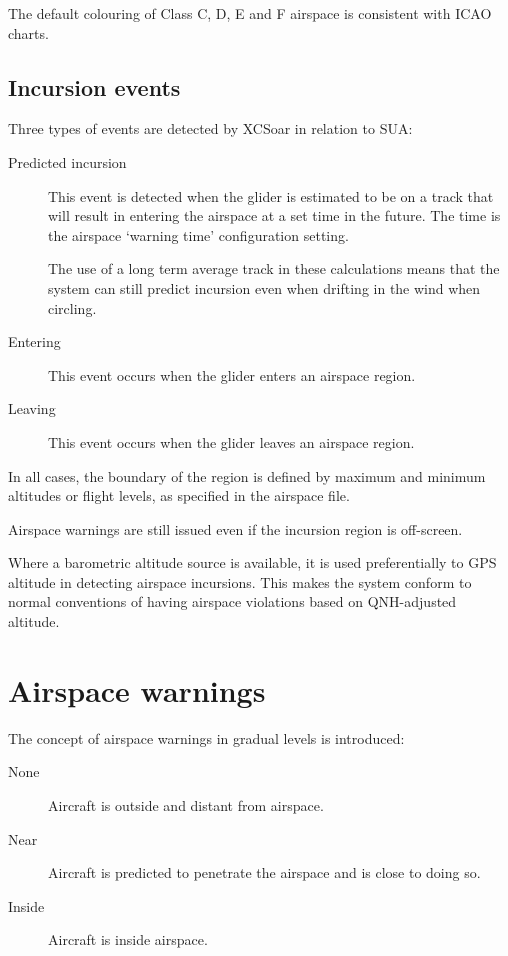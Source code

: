 The default colouring of Class C, D, E and F airspace is consistent
with ICAO charts.

\subsection*{Incursion events}

Three types of events are detected by XCSoar in relation to SUA:
\begin{description}
\item[Predicted incursion] This event is detected when the glider is estimated
to be on a track that will result in entering the airspace at a set
time in the future.  The time is the airspace `warning time'
configuration setting.

The use of a long term average track in these calculations means that
the system can still predict incursion even when drifting in the wind
when circling.


\item[Entering] This event occurs when the glider enters an airspace region.
\item[Leaving] This event occurs when the glider leaves an airspace region.
\end{description}
In all cases, the boundary of the region is defined by maximum and
minimum altitudes or flight levels, as specified in the airspace file.

Airspace warnings are still issued even if the incursion region is
off-screen.

Where a barometric altitude source is available, it is used
preferentially to GPS altitude in detecting airspace incursions.  This
makes the system conform to normal conventions of having airspace
violations based on QNH-adjusted altitude.

\section{Airspace warnings}

The concept of airspace warnings in gradual levels is introduced:
\begin{description}
\item[None] Aircraft is outside and distant from airspace.
\item[\colorbox{AirspaceYellow}{Near}] Aircraft is predicted to penetrate the airspace and
  is close to doing so.
\item[\colorbox{AirspaceRed}{Inside}] Aircraft is inside airspace.
\end{description}

